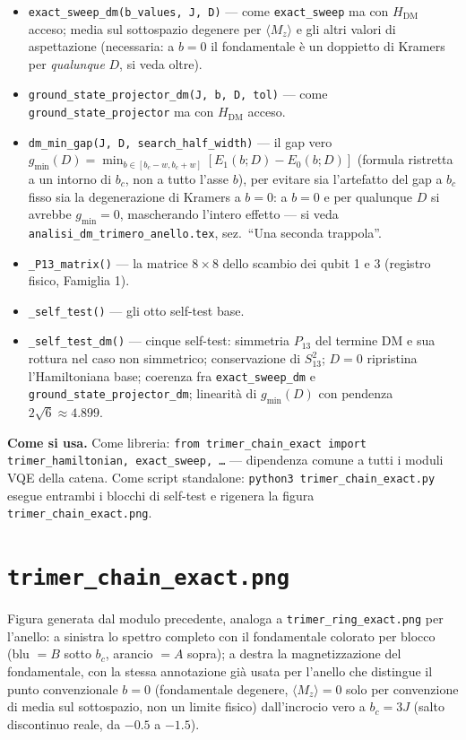 \documentclass[11pt,a4paper]{article}
\begin{document}
\begin{itemize}
\item \texttt{exact\_sweep\_dm(b\_values,\ J,\ D)} — come \texttt{exact\_sweep} ma con
$H_\text{DM}$ acceso; media sul sottospazio degenere per $\langle M_z\rangle$ e gli
altri valori di aspettazione (necessaria: a $b=0$ il fondamentale è un doppietto di
Kramers per \emph{qualunque} $D$, si veda oltre).
\item \texttt{ground\_state\_projector\_dm(J,\ b,\ D,\ tol)} — come
\texttt{ground\_state\_projector} ma con $H_\text{DM}$ acceso.
\item {\sloppy\texttt{dm\_min\_gap(J,\ D,\ search\_half\_width)} — il gap vero
$g_\text{min}(D)=\min_{b\in[b_c-w,b_c+w]}[E_1(b;D)-E_0(b;D)]$ (formula ristretta a un
intorno di $b_c$, non a tutto l'asse $b$), per evitare sia l'artefatto del gap a
$b_c$ fisso sia la degenerazione di Kramers a $b=0$: a $b=0$ e per qualunque $D$ si
avrebbe $g_\text{min}=0$, mascherando l'intero effetto — si veda
\texttt{analisi\_dm\_trimero\_anello.tex}, sez.\ ``Una seconda trappola''.\par}
\item \texttt{\_P13\_matrix()} — la matrice $8\times8$ dello scambio dei qubit 1 e
3 (registro fisico, Famiglia 1).
\item \texttt{\_self\_test()} — gli otto self-test base.
\item \texttt{\_self\_test\_dm()} — cinque self-test: simmetria $P_{13}$ del termine
DM e sua rottura nel caso non simmetrico; conservazione di $S_{13}^2$; $D=0$
ripristina l'Hamiltoniana base; coerenza fra \texttt{exact\_sweep\_dm} e
\texttt{ground\_state\_projector\_dm}; linearità di $g_\text{min}(D)$ con pendenza
$2\sqrt6\approx4.899$.
\end{itemize}

\textbf{Come si usa.} Come libreria: \texttt{from trimer\_chain\_exact import
trimer\_hamiltonian, exact\_sweep, \ldots} — dipendenza comune a tutti i moduli VQE
della catena. Come script standalone: \texttt{python3 trimer\_chain\_exact.py}
esegue entrambi i blocchi di self-test e rigenera la figura
\texttt{trimer\_chain\_exact.png}.

\section*{\texttt{trimer\_chain\_exact.png}}

Figura generata dal modulo precedente, analoga a \texttt{trimer\_ring\_exact.png}
per l'anello: a sinistra lo spettro completo con il fondamentale colorato per blocco
(blu $=B$ sotto $b_c$, arancio $=A$ sopra); a destra la magnetizzazione del
fondamentale, con la stessa annotazione già usata per l'anello che distingue il punto
convenzionale $b=0$ (fondamentale degenere, $\langle M_z\rangle=0$ solo per
convenzione di media sul sottospazio, non un limite fisico) dall'incrocio vero a
$b_c=3J$ (salto discontinuo reale, da $-0.5$ a $-1.5$).
\end{document}
